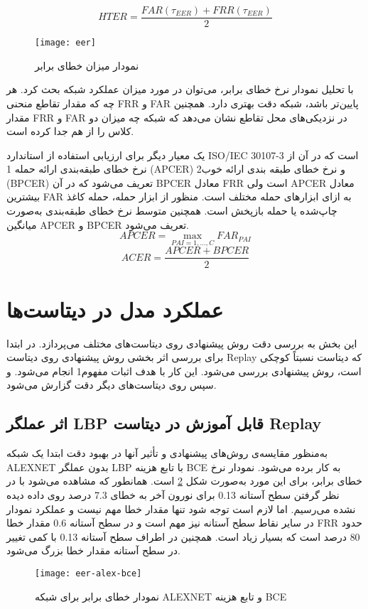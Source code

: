 \begin{equation}\label{eq:hter}
	HTER=\frac{FAR(\tau_{EER})+FRR(\tau_{EER})}{2}
\end{equation}

 \begin{figure}[ht]
	\centerline{\texttt{[image: eer]}}
	\caption{نمودار میزان خطای برابر}
	\label{fig:eer}
\end{figure}

با تحلیل نمودار نرخ خطای برابر، می‌توان در مورد میزان عملکرد شبکه بحث کرد. هر چه که مقدار تقاطع منحنی FRR و FAR پایین‌تر باشد، شبکه دقت بهتری دارد. همچنین مقدار FRR و FAR در نزدیکی‌های محل تقاطع نشان می‌دهد که شبکه چه میزان دو کلاس را از هم جدا کرده است.

یک معیار دیگر برای ارزیابی استفاده از استاندارد ISO/IEC 30107-3 است که در آن از نرخ خطای طبقه‌بندی ارائه حمله 1 (APCER) و نرخ خطای طبقه بندی ارائه خوب2 (BPCER) تعریف می‌شود که در آن BPCER معادل FRR است ولی APCER معادل بیشترین FAR به ازای ابزارهای حمله مختلف است.
منظور از ابزار حمله، حمله کاغذ چاپ‌شده یا حمله بازپخش است. همچنین متوسط نرخ خطای طبقه‌بندی به‌صورت میانگین APCER و BPCER تعریف می‌شود.
\begin{equation}\label{eq:apcer}
	APCER=\max_{PAI=1,...,C}{FAR_{PAI}}
\end{equation}
\begin{equation}\label{eq:ACER}
	ACER=\frac{APCER+BPCER}{2}
\end{equation}
\section{عملکرد مدل در دیتاست‌ها}
این بخش به بررسی دقت روش پیشنهادی روی دیتاست‌های مختلف می‌پردازد. در ابتدا برای بررسی اثر بخشی روش پیشنهادی روی دیتاست Replay که دیتاست نسبتاً کوچکی است، روش پیشنهادی بررسی می‌شود. این کار با هدف اثبات مفهوم1 انجام می‌شود. و سپس روی دیتاست‌های دیگر دقت گزارش می‌شود.
\subsection{اثر عملگر LBP قابل آموزش در دیتاست Replay}
به‌منظور مقایسه‌ی روش‌های پیشنهادی و تأثیر آنها در بهبود دقت ابتدا یک شبکه ALEXNET بدون عملگر LBP با تابع هزینه BCE به کار برده می‌شود. نمودار نرخ خطای برابر، برای این مورد به‌صورت شکل 
\ref{fig:eer-alex-bce} 
است. همانطور که مشاهده می‌شود با در نظر گرفتن سطح آستانه 0.13 برای نورون آخر به خطای 7.3 درصد روی داده دیده نشده می‌رسیم. اما لازم است توجه شود تنها مقدار خطا مهم نیست و عملکرد نمودار در سایر نقاط سطح آستانه نیز مهم است و در سطح آستانه 0.6 مقدار خطا FRR حدود 80 درصد است که بسیار زیاد است. همچنین در اطراف سطح آستانه 0.13 با کمی تغییر در سطح آستانه مقدار خطا بزرگ می‌شود.
\begin{figure}[h]
	\centerline{\texttt{[image: eer-alex-bce]}}
	\caption{نمودار خطای برابر برای شبکه ALEXNET و تابع هزینه BCE}
	\label{fig:eer-alex-bce}
\end{figure}

